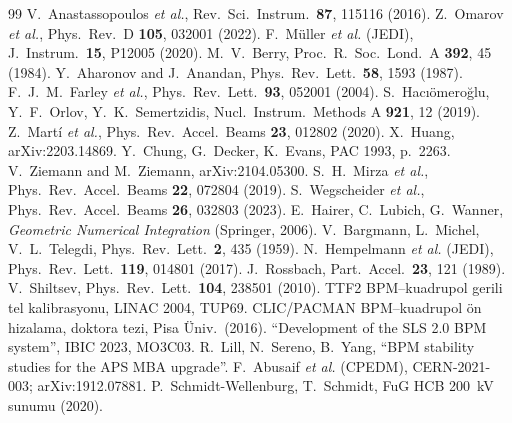 \documentclass[11pt,a4paper]{article}
\begin{document}
\begin{thebibliography}{99}\small
{} V.~Anastassopoulos \emph{et al.}, Rev.\ Sci.\ Instrum.\ \textbf{87}, 115116 (2016).
 Z.~Omarov \emph{et al.}, Phys.\ Rev.\ D \textbf{105}, 032001 (2022).
 F.~Müller \emph{et al.} (JEDI), J.\ Instrum.\ \textbf{15}, P12005 (2020).
 M.~V.~Berry, Proc.\ R.\ Soc.\ Lond.\ A \textbf{392}, 45 (1984).
 Y.~Aharonov and J.~Anandan, Phys.\ Rev.\ Lett.\ \textbf{58}, 1593 (1987).
 F.~J.~M.~Farley \emph{et al.}, Phys.\ Rev.\ Lett.\ \textbf{93}, 052001 (2004).
 S.~Hacıömeroğlu, Y.~F.~Orlov, Y.~K.~Semertzidis, Nucl.\ Instrum.\ Methods A
\textbf{921}, 12 (2019).
 Z.~Martí \emph{et al.}, Phys.\ Rev.\ Accel.\ Beams \textbf{23}, 012802 (2020).
 X.~Huang, arXiv:2203.14869.
 Y.~Chung, G.~Decker, K.~Evans, PAC 1993, p.~2263.
 V.~Ziemann and M.~Ziemann, arXiv:2104.05300.
 S.~H.~Mirza \emph{et al.}, Phys.\ Rev.\ Accel.\ Beams \textbf{22}, 072804 (2019).
 S.~Wegscheider \emph{et al.}, Phys.\ Rev.\ Accel.\ Beams \textbf{26}, 032803 (2023).
 E.~Hairer, C.~Lubich, G.~Wanner, \emph{Geometric Numerical Integration} (Springer, 2006).
 V.~Bargmann, L.~Michel, V.~L.~Telegdi, Phys.\ Rev.\ Lett.\ \textbf{2}, 435 (1959).
 N.~Hempelmann \emph{et al.} (JEDI), Phys.\ Rev.\ Lett.\ \textbf{119}, 014801 (2017).
 J.~Rossbach, Part.\ Accel.\ \textbf{23}, 121 (1989).
 V.~Shiltsev, Phys.\ Rev.\ Lett.\ \textbf{104}, 238501 (2010).
 TTF2 BPM--kuadrupol gerili tel kalibrasyonu, LINAC 2004, TUP69.
 CLIC/PACMAN BPM--kuadrupol ön hizalama, doktora tezi, Pisa Üniv.\ (2016).
 ``Development of the SLS 2.0 BPM system'', IBIC 2023, MO3C03.
 R.~Lill, N.~Sereno, B.~Yang, ``BPM stability studies for the APS MBA upgrade''.
 F.~Abusaif \emph{et al.} (CPEDM), CERN-2021-003; arXiv:1912.07881.
 P.~Schmidt-Wellenburg, T.~Schmidt, FuG HCB 200~kV sunumu (2020).
\end{thebibliography}
\end{document}
